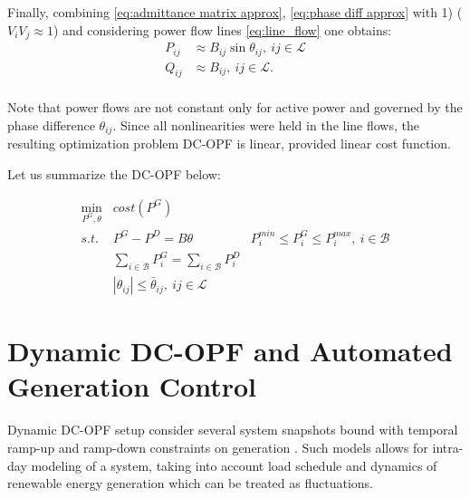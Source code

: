 Finally, combining \eqref{eq:admittance matrix approx}, \eqref{eq:phase diff approx} with 1) ($V_i V_j \approx 1$) and considering power flow lines \eqref{eq:line_flow} one obtains:
\begin{equation}
    \begin{aligned}
        P_{ij} &\approx B_{ij} \sin \theta_{ij} , ~ij \in \mathcal{L} \\
        Q_{ij} &\approx B_{ij} , ~ij \in \mathcal{L}. \\
    \end{aligned}
    \label{eq:line_flow_keked}
\end{equation}

Note that power flows are not constant only for active power and governed by the phase difference $\theta_{ij}$. Since all nonlinearities were held in the line flows, the resulting optimization problem DC-OPF is linear, provided linear cost function.

Let us summarize the DC-OPF below:

\begin{equation}
    \begin{aligned}
        \min_{P^G, \theta}  & \textit{cost}(P^G) \\
        \textit{s.t. }      & P^G - P^D = B\theta
                            & P_i^{min} \leq P_i^G \leq P_i^{max}, ~ i \in \mathcal{B} \\ 
                            & \sum_{i \in \mathcal{B}} P^G_i = \sum_{i \in \mathcal{B}} P^D_i \\
                            & |\theta_{ij}| \leq \bar{\theta}_{ij}, ~ ij \in \mathcal{L}
    \end{aligned}
    \label{eq:dc-opf}
\end{equation}

\section{Dynamic DC-OPF and Automated Generation Control}

Dynamic DC-OPF setup consider several system snapshots bound with temporal ramp-up and ramp-down constraints on generation \cite{lou2019multi, machowski2020power}. Such models allows for intra-day modeling of a system, taking into account load schedule and dynamics of renewable energy generation which can be treated as fluctuations.

